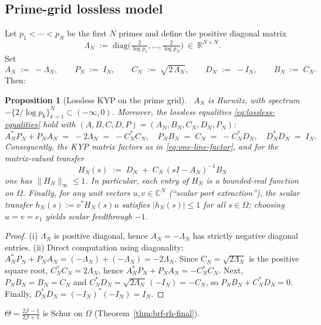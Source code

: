 \documentclass[11pt]{article}
\newtheorem{proposition}[theorem]{Proposition}
\theoremstyle{definition}
\theoremstyle{remark}
\newcommand{\C}{\mathbb{C}}
\newcommand{\R}{\mathbb{R}}
\begin{document}
\subsection{Prime-grid lossless model}\label{subsec:prime-grid-KYP}
Let \(p_1<\cdots<p_N\) be the first \(N\) primes and define the positive diagonal matrix
\[
 \Lambda_N\;:=\;\mathrm{diag}\!\Big(\tfrac{2}{\log p_1},\dots,\tfrac{2}{\log p_N}\Big)\ \in\ \R^{N\times N}.
\]
Set
\[
 A_N\;:=\;-\Lambda_N,\qquad P_N\;:=\;I_N,\qquad C_N\;:=\;\sqrt{2\,\Lambda_N},\qquad D_N\;:=\;-I_N,\qquad B_N\;:=\;C_N.
\]
Then:
\begin{proposition}[Lossless KYP on the prime grid]\label{prop:prime-grid-KYP}
\ \(A_N\) is Hurwitz, with spectrum \(-\{2/\log p_k\}_{k=1}^N\subset(-\infty,0)\). Moreover, the lossless equalities \eqref{eq:lossless-equalities} hold with \((A,B,C,D,P)=(A_N,B_N,C_N,D_N,P_N)\):
 \[
  A_N^*P_N+P_NA_N\;=\;-2\Lambda_N\;=\;-C_N^*C_N,\quad P_NB_N\;=\;C_N\;=\;-C_N^*D_N,\quad D_N^*D_N\;=\;I_N.
 \]
Consequently, the KYP matrix factors as in \eqref{eq:one-line-factor}, and for the matrix-valued transfer
 \[
  H_N(s)\;:=\;D_N\; +\; C_N\,(sI-A_N)^{-1} B_N
 \]
one has \(\|H_N\|_\infty\le 1\). In particular, each entry of \(H_N\) is a bounded-real function on \(\Omega\). Finally, for any unit vectors \(u,v\in\C^N\) (``scalar port extraction''), the scalar transfer \(h_N(s):=v^*H_N(s)u\) satisfies \(|h_N(s)|\le 1\) for all \(s\in\Omega\); choosing \(u=v=e_1\) yields scalar feedthrough \(-1\).
\end{proposition}
\begin{proof}
(i) \(\Lambda_N\) is positive diagonal, hence \(A_N=-\Lambda_N\) has strictly negative diagonal entries.
(ii) Direct computation using diagonality: \(A_N^*P_N+P_NA_N=(-\Lambda_N)+(-\Lambda_N)=-2\Lambda_N\). Since \(C_N=\sqrt{2\Lambda_N}\) is the positive square root, \(C_N^*C_N=2\Lambda_N\), hence \(A_N^*P_N+P_NA_N=-C_N^*C_N\). Next, \(P_NB_N=B_N=C_N\) and \(C_N^*D_N=\sqrt{2\Lambda_N}\,(-I_N)=-C_N\), so \(P_NB_N+ C_N^*D_N=0\). Finally, \(D_N^*D_N=(-I_N)^*(-I_N)=I_N\).
\end{proof}

\(\Theta=\frac{2\mathcal J-1}{2\mathcal J+1}\) is Schur on \(\Omega\) (Theorem~\ref{thm:brf-rh-final}).
\end{document}
